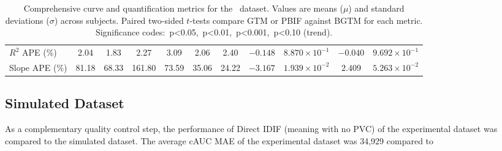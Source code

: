\begin{sidewaystable}[b]
\begin{tabular}{l|cc|cc|cc|cc|cc}
		\(R^2\) APE (\%)                 & 2.04                               & 1.83                              & 2.27                               & 3.09                                      & 2.06                                      & 2.40       & \(-0.148\) & \(8.870\times10^{-1}\)         & \(-0.040\) & \(9.692\times10^{-1}\) \\
		Slope APE (\%)                   & 81.18                              & 68.33                             & 161.80                             & 73.59                                     & 35.06                                     & 24.22      & \(-3.167\) & \(1.939\times10^{-2}\)\sym{*}  & \(2.409\)  & \(5.263\times10^{-2}\) \\
		\bottomrule
	\end{tabular}
	\caption{Comprehensive curve and quantification metrics for the \yohimbine\ dataset.
		Values are means (\(\mu\)) and standard deviations (\(\sigma\)) across subjects.
		Paired two-sided \(t\)-tests compare GTM or PBIF against BGTM for each metric.
		Significance codes: \sym{*}\,p<0.05, \sym{**}\,p<0.01, \sym{***}\,p<0.001, \sym{\dag}\,p<0.10 (trend).}
	\label{tab:metrics_all_yoh}
\end{sidewaystable}

\subsection{Simulated Dataset}

As a complementary quality control step, the performance of Direct IDIF (meaning with no PVC) of the experimental dataset was compared to the simulated dataset.
The average cAUC MAE of the experimental dataset was 34,929 compared to 
